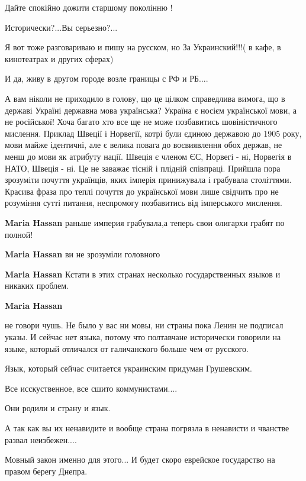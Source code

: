 \begin{itemize}
Дайте спокійно дожити старшому поколінню !



Исторически?...Вы серьезно?...

Я вот тоже разговариваю и пишу на русском, но За Украинский!!!( в кафе, в
кинотеатрах и других сферах)

И да, живу в другом городе возле границы с РФ и РБ....


А вам ніколи не приходило в голову, що це цілком справедлива вимога, що в
державі Україні державна мова українська? Україна є носієм української мови, а
не російської! Хоча багато хто все ще не може позбавитись шовіністичного
мислення. Приклад Швеції і Норвегії, котрі були єдиною державою до 1905 року,
мови майже ідентичні, але є велика повага до воєвиявлення обох держав, не менш
до мови як атрибуту нації. Швеція є членом ЄС, Норвегі - ні, Норвегія в НАТО,
Швеція - ні. Це не заважає тісній і плідній співпраці. Прийшла пора зрозуміти
почуття українців, яких імперія принижувала і грабувала століттями. Красива
фраза про теплі почуття до української мови лише свідчить про не розуміння
сутті питання, неспромогу позбавитись від імперського мислення.

\begin{itemize}

\textbf{Maria Hassan} раньше империя грабувала,а теперь свои олигархи грабят по полной!

\textbf{Maria Hassan} ви не зрозуміли головного

\textbf{Maria Hassan} Кстати в этих странах несколько государственных языков и никаких проблем.

\textbf{Maria Hassan} 

не говори чушь. Не было у вас ни мовы, ни страны пока Ленин не подписал указы.
И сейчас нет языка, потому что полтавчане исторически говорили на языке,
который отличался от галичанского больше чем от русского.

Язык, который сейчас считается украинским придуман Грушевским.

Все исскуственное, все сшито коммунистами....

Они родили и страну и язык.

А так как вы их ненавидите и вообще страна погрязла в ненависти и чванстве развал неизбежен....

Мовный закон именно для этого... И будет скоро еврейское государство на правом берегу Днепра.



\end{itemize}
\end{itemize}
